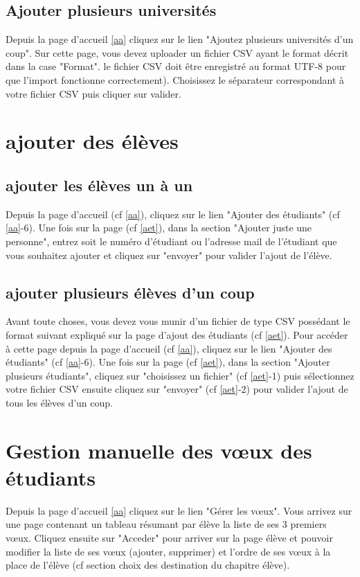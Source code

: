 \subsection{Ajouter plusieurs universités} 
\label{au}

Depuis la page d'accueil \ref{aa} cliquez sur le lien "Ajoutez plusieurs universités d'un coup". Sur cette page, vous devez uploader un fichier CSV ayant le format décrit dans la case "Format". \att le fichier CSV doit être enregistré au format UTF-8 pour que l'import fonctionne correctement). Choisissez le séparateur correspondant à votre fichier CSV puis cliquer sur valider.

\section{ajouter des élèves}
\label{ael}

\subsection{ajouter les élèves un à un}
Depuis la page d'accueil (cf \ref{aa}), cliquez sur le lien "Ajouter des étudiants" (cf \ref{aa}-6). Une fois sur la page (cf \ref{aet}), dans la section "Ajouter juste une personne", entrez soit le numéro d'étudiant ou l'adresse mail de l'étudiant que vous souhaitez ajouter et cliquez sur "envoyer" pour valider l'ajout de l'élève.

\subsection{ajouter plusieurs élèves d'un coup}
Avant toute choses, vous devez vous munir d'un fichier de type CSV possédant le format suivant expliqué sur la page d'ajout des étudiants (cf \ref{aet}).
Pour accéder à cette page depuis la page d'accueil (cf \ref{aa}), cliquez sur le lien "Ajouter des étudiants" (cf \ref{aa}-6). Une fois sur la page (cf \ref{aet}), dans la section "Ajouter plusieurs étudiants", cliquez sur "choisissez un fichier" (cf \ref{aet}-1) puis sélectionnez votre fichier CSV ensuite cliquez sur "envoyer" (cf \ref{aet}-2) pour valider l'ajout de tous les élèves d'un coup. 

\section{Gestion manuelle des vœux des étudiants}

Depuis la page d'accueil \ref{aa} cliquez sur le lien "Gérer les vœux". Vous arrivez sur une page contenant un tableau résumant par élève la liste de ses 3 premiers vœux. Cliquez ensuite sur "Acceder" pour arriver sur la page élève et pouvoir modifier la liste de ses vœux (ajouter, supprimer) et l'ordre de ses vœux à la place de l'élève (cf section choix des destination du chapitre élève).

